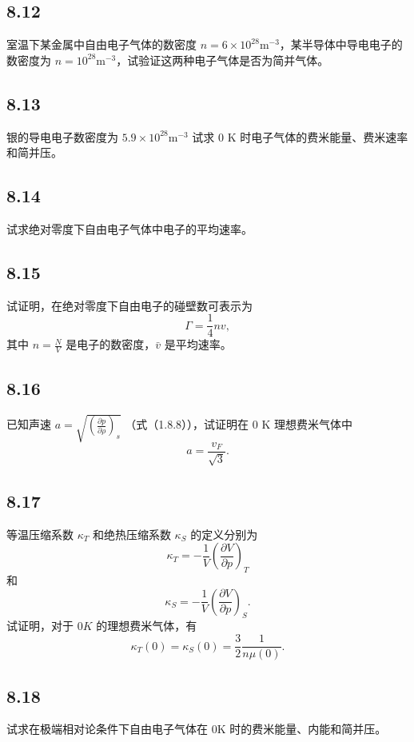 \newpage
\subsection{8.12}
室温下某金属中自由电子气体的数密度 $n = 6 \times 10^{28} \mathrm{m}^{-3}$，某半导体中导电电子的数密度为 $n = 10^{28} \mathrm{m}^{-3}$，试验证这两种电子气体是否为简并气体。

\newpage
\subsection{8.13}
银的导电电子数密度为 $5.9 \times 10^{28} \mathrm{m}^{-3}$ 试求 0 K 时电子气体的费米能量、费米速率和简并压。

\newpage
\subsection{8.14}
试求绝对零度下自由电子气体中电子的平均速率。

\newpage
\subsection{8.15}
试证明，在绝对零度下自由电子的碰壁数可表示为
$$ \Gamma = \frac{1}{4} nv, $$
其中 $n = \frac{N}{V}$ 是电子的数密度，$\bar{v}$ 是平均速率。

\newpage
\subsection{8.16}
已知声速 $a = \sqrt{\left( \frac{\partial p}{\partial \rho} \right)_s}$ （式（1.8.8）），试证明在 0 K 理想费米气体中
$$ a = \frac{v_F}{\sqrt{3}}. $$

\newpage
\subsection{8.17}
等温压缩系数 $\kappa_T$ 和绝热压缩系数 $\kappa_S$ 的定义分别为
$$ \kappa_T = -\frac{1}{V}\left(\frac{\partial V}{\partial p}\right)_T $$
和
$$ \kappa_S = -\frac{1}{V}\left(\frac{\partial V}{\partial p}\right)_S. $$
试证明，对于 $0 K$ 的理想费米气体，有
$$ \kappa_T(0) = \kappa_S(0) = \frac{3}{2}\frac{1}{n\mu(0)}. $$

\newpage
\subsection{8.18}
试求在极端相对论条件下自由电子气体在 0K 时的费米能量、内能和简并压。

\newpage
